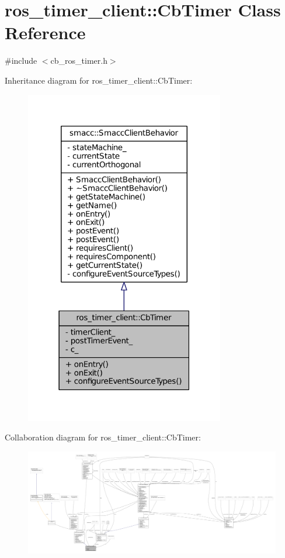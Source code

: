 \hypertarget{classros__timer__client_1_1CbTimer}{}\section{ros\+\_\+timer\+\_\+client\+:\+:Cb\+Timer Class Reference}
\label{classros__timer__client_1_1CbTimer}


{\ttfamily \#include $<$cb\+\_\+ros\+\_\+timer.\+h$>$}



Inheritance diagram for ros\+\_\+timer\+\_\+client\+:\+:Cb\+Timer\+:
\nopagebreak
\begin{figure}[H]
\begin{center}
\leavevmode
\includegraphics[width=247pt]{classros__timer__client_1_1CbTimer__inherit__graph}
\end{center}
\end{figure}


Collaboration diagram for ros\+\_\+timer\+\_\+client\+:\+:Cb\+Timer\+:
\nopagebreak
\begin{figure}[H]
\begin{center}
\leavevmode
\includegraphics[width=350pt]{classros__timer__client_1_1CbTimer__coll__graph}
\end{center}
\end{figure}
